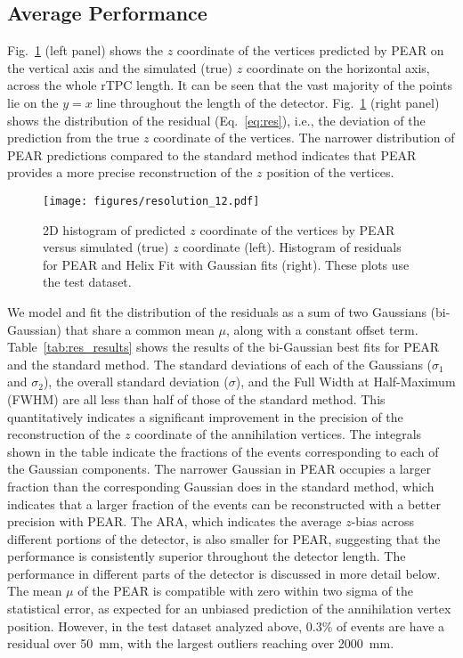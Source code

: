 \documentclass[a4paper,11pt]{article}
\begin{document}
\subsection{Average Performance\label{subsec:avg_performance}}
Fig.~\ref{fig:res_dist} (left panel) shows the $z$ coordinate of the vertices predicted by PEAR on the vertical axis and the simulated (true) $z$ coordinate on the horizontal axis, across the whole rTPC length. It can be seen that the vast majority of the points lie on the $y=x$ line throughout the length of the detector. Fig.~\ref{fig:res_dist} (right panel) shows the distribution of the residual (Eq.~\ref{eq:res}), i.e., the deviation of the prediction from the true $z$ coordinate of the vertices. The narrower distribution of PEAR predictions compared to the standard method indicates that PEAR provides a more precise reconstruction of the $z$ position of the vertices. 

\begin{figure}[htbp]
    \centering
    \texttt{[image: figures/resolution\_12.pdf]}
    \caption{\label{fig:res_dist} 2D histogram of predicted $z$ coordinate of the vertices by PEAR versus simulated (true) $z$ coordinate (left). Histogram of residuals for PEAR and Helix Fit with Gaussian fits (right). These plots use the test dataset.}
\end{figure}

We model and fit the distribution of the residuals as a sum of two Gaussians (bi-Gaussian) that share a common mean $\mu$, along with a constant offset term. Table~\ref{tab:res_results} shows the results of the bi-Gaussian best fits for PEAR and the standard method. The standard deviations of each of the Gaussians ($\sigma_1$ and $\sigma_2$), the overall standard deviation ($\sigma$), and the Full Width at Half-Maximum (FWHM) are all less than half of those of the standard method. This quantitatively indicates a significant improvement in the precision of the reconstruction of the $z$ coordinate of the annihilation vertices. The integrals shown in the table indicate the fractions of the events corresponding to each of the Gaussian components. The narrower Gaussian in PEAR occupies a larger fraction than the corresponding Gaussian does in the standard method, which indicates that a larger fraction of the events can be reconstructed with a better precision with PEAR. The ARA, which indicates the average $z$-bias across different portions of the detector, is also smaller for PEAR, suggesting that the performance is consistently superior throughout the detector length. The performance in different parts of the detector is discussed in more detail below. The mean $\mu$ of the PEAR is compatible with zero within two sigma of the statistical error, as expected for an unbiased prediction of the annihilation vertex position. However, in the test dataset analyzed above, 0.3\% of events are have a residual over 50~mm, with the largest outliers reaching over 2000~mm.
\end{document}
